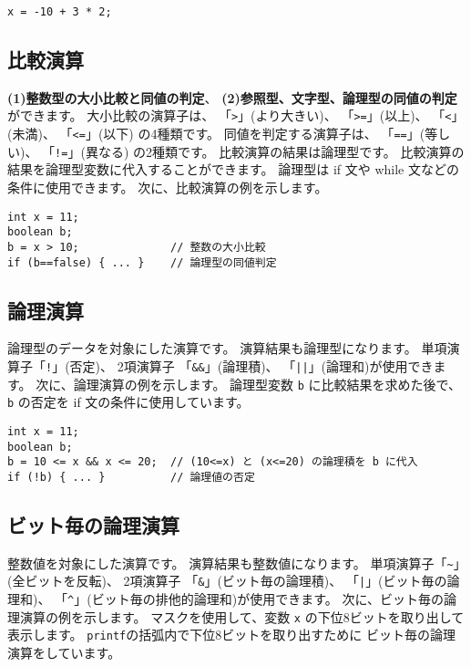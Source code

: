 \begin{mylist}
\begin{verbatim}
x = -10 + 3 * 2;
\end{verbatim}
\end{mylist}

\subsection{比較演算}

{\bf (1)整数型の大小比較と同値の判定}、
{\bf (2)参照型、文字型、論理型の同値の判定}ができます。
大小比較の演算子は、
「\verb/>/」(より大きい)、
「\verb/>=/」(以上)、
「\verb/</」(未満)、
「\verb/<=/」(以下) の4種類です。
同値を判定する演算子は、
「\verb/==/」(等しい)、
「\verb/!=/」(異なる)
の2種類です。
比較演算の結果は論理型です。
比較演算の結果を論理型変数に代入することができます。
論理型は if 文や while 文などの条件に使用できます。
次に、比較演算の例を示します。

\begin{mylist}
\begin{verbatim}
int x = 11;
boolean b;
b = x > 10;              // 整数の大小比較
if (b==false) { ... }    // 論理型の同値判定
\end{verbatim}
\end{mylist}

\subsection{論理演算}

論理型のデータを対象にした演算です。
演算結果も論理型になります。
単項演算子「\verb/!/」(否定)、
2項演算子
「\verb/&&/」(論理積)、
「\verb/||/」(論理和)が使用できます。
次に、論理演算の例を示します。
論理型変数 \verb/b/ に比較結果を求めた後で、
\verb/b/ の否定を if 文の条件に使用しています。

\begin{mylist}
\begin{verbatim}
int x = 11;
boolean b;
b = 10 <= x && x <= 20;  // (10<=x) と (x<=20) の論理積を b に代入
if (!b) { ... }          // 論理値の否定
\end{verbatim}
\end{mylist}

\subsection{ビット毎の論理演算}

整数値を対象にした演算です。
演算結果も整数値になります。
単項演算子「\verb/~/」(全ビットを反転)、
2項演算子
「\verb/&/」(ビット毎の論理積)、
「\verb/|/」(ビット毎の論理和)、
「\verb/^/」(ビット毎の排他的論理和)が使用できます。
次に、ビット毎の論理演算の例を示します。
マスクを使用して、変数 \verb/x/ の下位8ビットを取り出して表示します。
\verb/printf/の括弧内で下位8ビットを取り出すために
ビット毎の論理演算をしています。

